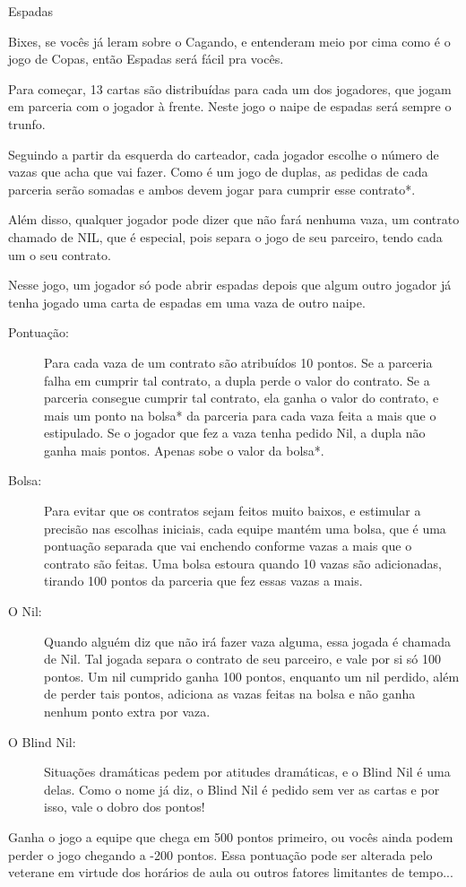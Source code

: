 \begin{subsecao}{Espadas} 

Bixes, se vocês já leram sobre o Cagando, e entenderam meio por cima como é o
jogo de Copas, então Espadas será fácil pra vocês.

Para começar, 13 cartas são distribuídas para cada um dos jogadores, que jogam
em parceria com o jogador à frente. Neste jogo o naipe de espadas será sempre o
trunfo.

Seguindo a partir da esquerda do carteador, cada jogador escolhe o número de
vazas que acha que vai fazer. Como é um jogo de duplas, as pedidas de cada
parceria serão somadas e ambos devem jogar para cumprir esse contrato*. 

Além disso, qualquer jogador pode dizer que não fará nenhuma vaza, um contrato
chamado de NIL, que é especial, pois separa o jogo de seu parceiro, tendo cada
um o seu contrato.

Nesse jogo, um jogador só pode abrir espadas depois que algum outro jogador já
tenha jogado uma carta de espadas em uma vaza de outro naipe.
\begin{description}

\item[Pontuação:]

Para cada vaza de um contrato são atribuídos 10 pontos. Se a parceria falha em
cumprir tal contrato, a dupla perde o valor do contrato. Se a parceria consegue
cumprir tal contrato, ela ganha o valor do contrato, e mais um ponto
na bolsa* da parceria para cada vaza feita a mais que o estipulado.
Se o jogador que fez a vaza tenha pedido Nil, a dupla não ganha mais pontos.
Apenas sobe o valor da bolsa*.

\item[Bolsa:]

Para evitar que os contratos sejam feitos muito baixos, e estimular a precisão
nas escolhas iniciais, cada equipe mantém uma bolsa, que é uma pontuação
separada que vai enchendo conforme vazas a mais que o contrato são feitas. Uma
bolsa estoura quando 10 vazas são adicionadas, tirando 100 pontos da parceria
que fez essas vazas a mais.

\item[O Nil:]
Quando alguém diz que não irá fazer vaza alguma, essa jogada é chamada de Nil.
Tal jogada separa o contrato de seu parceiro, e vale por si só 100 pontos. Um
nil cumprido ganha 100 pontos, enquanto um nil perdido, além de perder tais
pontos, adiciona as vazas feitas na bolsa e não ganha nenhum ponto extra por
vaza.

\item[O Blind Nil:]
Situações dramáticas pedem por atitudes dramáticas, e o Blind Nil é uma delas.
Como o nome já diz, o Blind Nil é pedido sem ver as cartas e por isso, vale o
dobro dos pontos!

\end{description}
Ganha o jogo a equipe que chega em 500 pontos primeiro, ou vocês ainda podem
perder o jogo chegando a -200 pontos. Essa pontuação pode ser alterada pelo
veterane em virtude dos horários de aula ou outros fatores limitantes de
tempo...

\end{subsecao}
